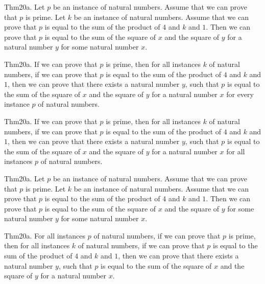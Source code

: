 \documentclass{article}
\begin{document}
Thm20a. Let $p$ be an instance of natural numbers. Assume that we can prove that $p$ is prime. Let $k$ be an instance of natural numbers. Assume that we can prove that $p$ is equal to the sum of the product of $4$ and $k$ and $1$. Then we can prove that $p$ is equal to the sum of the square of $x$ and the square of $y$ for a natural number $y$ for some natural number $x$.

Thm20a. If we can prove that $p$ is prime, then for all instances $k$ of natural numbers, if we can prove that $p$ is equal to the sum of the product of $4$ and $k$ and $1$, then we can prove that there exists a natural number $y$, such that $p$ is equal to the sum of the square of $x$ and the square of $y$ for a natural number $x$ for every instance $p$ of natural numbers.

Thm20a. If we can prove that $p$ is prime, then for all instances $k$ of natural numbers, if we can prove that $p$ is equal to the sum of the product of $4$ and $k$ and $1$, then we can prove that there exists a natural number $y$, such that $p$ is equal to the sum of the square of $x$ and the square of $y$ for a natural number $x$ for all instances $p$ of natural numbers.

Thm20a. Let $p$ be an instance of natural numbers. Assume that we can prove that $p$ is prime. Let $k$ be an instance of natural numbers. Assume that we can prove that $p$ is equal to the sum of the product of $4$ and $k$ and $1$. Then we can prove that $p$ is equal to the sum of the square of $x$ and the square of $y$ for some natural number $y$ for some natural number $x$.

Thm20a. For all instances $p$ of natural numbers, if we can prove that $p$ is prime, then for all instances $k$ of natural numbers, if we can prove that $p$ is equal to the sum of the product of $4$ and $k$ and $1$, then we can prove that there exists a natural number $y$, such that $p$ is equal to the sum of the square of $x$ and the square of $y$ for a natural number $x$.
\end{document}
